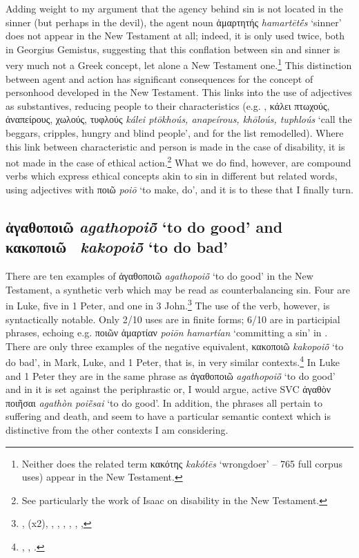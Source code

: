 \documentclass[output=paper,colorlinks,citecolor=brown]{langscibook}
\begin{document}
Adding weight to my argument that the agency behind sin is not located
in the sinner (but perhaps in the devil), the agent noun ἁμαρτητής
\textit{hamartētḗs} ‘sinner' does not appear in the New Testament at all; indeed, it
is only used twice, both in Georgius Gemistus, suggesting that this
conflation between sin and sinner is very much not a Greek concept, let
alone a New Testament one.\footnote{Neither does the related term
  κακότης \textit{kakótēs} ‘wrongdoer' -- 765 full corpus uses) appear in the New
  Testament.} 
  This distinction between agent and action has significant
consequences for the concept of personhood developed in the New
Testament. 
This links into the use of adjectives as substantives,
reducing people to their characteristics (e.g. , κάλει
πτωχούς, ἀναπείρους, χωλούς, τυφλούς \textit{kálei ptōkhoús, anapeírous, khōloús, tuphloús} ‘call the beggars, cripples, hungry
and blind people', and  for the list remodelled). 
Where this
link between characteristic and person is made in the case of
disability, it is not made in the case of ethical action.\footnote{See
  particularly the work of Isaac \citet{soon_disability_2021, soon_disabled_2023} on disability in the New
  Testament.} 
  What we do find, however, are compound
verbs which express ethical concepts akin to sin in different but
related words, using adjectives with ποιῶ \textit{poiō} ‘to make, do', and it is to these that I
finally turn.

\hypertarget{b.-ux1f00ux3b3ux3b1ux3b8ux3bfux3c0ux3bfux3b9ux1ff6-and-ux3baux3b1ux3baux3bfux3c0ux3bfux3b9ux1ff6}{%
\subsection{ἀγαθοποιῶ \textit{agathopoiō̃} ‘to do good' and
κακοποιῶ~ \textit{kakopoiō̃} ‘to do bad'}\label{b.-ux1f00ux3b3ux3b1ux3b8ux3bfux3c0ux3bfux3b9ux1ff6-and-ux3baux3b1ux3baux3bfux3c0ux3bfux3b9ux1ff6CR}}

There are ten examples of ἀγαθοποιῶ \textit{agathopoiō̃} ‘to do good' in the New Testament, a synthetic
verb which may be read as counterbalancing sin. 
 Four are in Luke, five in 1 Peter, and one in 3 John.\footnote{,  (x2), , , , , , , }
 The use of the verb, however, is syntactically notable. 
  Only
2/10 uses are in finite forms; 6/10 are in participial phrases, echoing
e.g. ποιῶν ἁμαρτίαν \textit{poiōn hamartían} ‘committing a sin' in . There are only three examples of the
negative equivalent, κακοποιῶ \textit{kakopoiō̃} ‘to do bad', in Mark, Luke, and 1 Peter, that is, in
very similar contexts.\footnote{, , .} 
In
Luke and 1 Peter they are in the same phrase as ἀγαθοποιῶ \textit{agathopoiō̃} ‘to do good' and in  it is set against the periphrastic or, I would argue, active SVC
ἀγαθὸν ποιῆσαι \textit{agathòn poiē̃sai} ‘to do good'. 
In addition, the phrases all pertain to suffering and
death, and seem to have a particular semantic context which is
distinctive from the other contexts I am considering.
\end{document}
